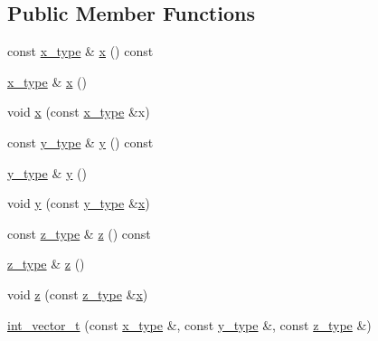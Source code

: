 \subsection*{Public Member Functions}
\begin{DoxyCompactItemize}
\item 
const \hyperlink{classint__vector__t_a707ce51b5d31dcba928e26f41fa36cfa}{x\+\_\+type} \& \hyperlink{classint__vector__t_a594dd2055e5fe58eadb41177c23e406b}{x} () const 
\item 
\hyperlink{classint__vector__t_a707ce51b5d31dcba928e26f41fa36cfa}{x\+\_\+type} \& \hyperlink{classint__vector__t_ad5342135f1fddb1d291f2c8a60a1c891}{x} ()
\item 
void \hyperlink{classint__vector__t_af67370581e68faa8054d513e2616acca}{x} (const \hyperlink{classint__vector__t_a707ce51b5d31dcba928e26f41fa36cfa}{x\+\_\+type} \&x)
\item 
const \hyperlink{classint__vector__t_a7aa2a9276bdee3fad0e216343485a844}{y\+\_\+type} \& \hyperlink{classint__vector__t_a5b40d656ef8a62f880dc86098ae79649}{y} () const 
\item 
\hyperlink{classint__vector__t_a7aa2a9276bdee3fad0e216343485a844}{y\+\_\+type} \& \hyperlink{classint__vector__t_af2224a283e5b7d8e9b80e7f84290320a}{y} ()
\item 
void \hyperlink{classint__vector__t_ad01c94b1cafb22f5eeda8632113bea4a}{y} (const \hyperlink{classint__vector__t_a7aa2a9276bdee3fad0e216343485a844}{y\+\_\+type} \&\hyperlink{classint__vector__t_a594dd2055e5fe58eadb41177c23e406b}{x})
\item 
const \hyperlink{classint__vector__t_a20a60edf9f56f9455dc62b4e5f547bc3}{z\+\_\+type} \& \hyperlink{classint__vector__t_a636168acc3d1f5ded650d0f8f0a3b9e8}{z} () const 
\item 
\hyperlink{classint__vector__t_a20a60edf9f56f9455dc62b4e5f547bc3}{z\+\_\+type} \& \hyperlink{classint__vector__t_a917a6a9f765a4521ce9ce378b5fc4177}{z} ()
\item 
void \hyperlink{classint__vector__t_a43d15bdc3ac6f698ddb66ab586e1ecc1}{z} (const \hyperlink{classint__vector__t_a20a60edf9f56f9455dc62b4e5f547bc3}{z\+\_\+type} \&\hyperlink{classint__vector__t_a594dd2055e5fe58eadb41177c23e406b}{x})
\item 
\hyperlink{classint__vector__t_a7a5ff45f84e844e190bd6e41980bc365}{int\+\_\+vector\+\_\+t} (const \hyperlink{classint__vector__t_a707ce51b5d31dcba928e26f41fa36cfa}{x\+\_\+type} \&, const \hyperlink{classint__vector__t_a7aa2a9276bdee3fad0e216343485a844}{y\+\_\+type} \&, const \hyperlink{classint__vector__t_a20a60edf9f56f9455dc62b4e5f547bc3}{z\+\_\+type} \&)

\end{DoxyCompactItemize}
